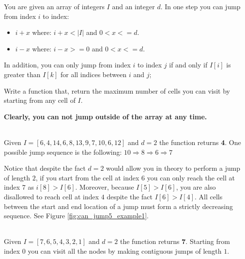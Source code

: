 \begin{exercise}
    You are given an array of integers $I$  and an integer $d$.
    In one step you can jump from index $i$ to index:
    \begin{itemize}
        \item $i + x$ where: $i + x < |I|$ and $0 < x <= d$.
        \item $i - x$ where: $i - x >= 0$ and $0 < x <= d$. 
    \end{itemize}
    In addition, you can only jump from index $i$ to index $j$ if and only if $I[i]$ is greater than $I[k]$ for all indices between $i$ and $j$;
        
    Write a function that, return the maximum number of cells you can visit by starting from any cell of $I$.
              
    \textbf{Clearly, you can not jump outside of the array at any time.}
    
    \begin{example}
        \hfill \\
        Given  $I=[6,4,14,6,8,13,9,7,10,6,12]$ and $d=2$ the function returns \textbf{4}.
        One possible jump sequence is the following:
        $10 \Rightarrow 8 \Rightarrow 6 \Rightarrow 7 $
        
        Notice that despite the fact $d=2$ would allow you in theory to perform a jump of length $2$, if you start from the cell at index $6$ you can only reach the cell at index $7$ as $i[8]>I[6]$. Moreover, because $I[5] > I[6]$, you are also disallowed to reach cell at index $4$ despite the fact $I[6] > I[4]$. All cells between the start and end location of a jump must form a strictly decreasing sequence. See Figure \ref{fig:can_jump5_example1}.
        \label{ex:can_jump5_example1}
    \end{example}


    \begin{example}
        \hfill \\
        Given  $I=[7,6,5,4,3,2,1]$ and $d=2$ the function returns \textbf{7}.
        Starting from index $0$ you can visit all the nodes by making contiguous jumps of length $1$.
        \label{ex:can_jump5_example2}
    \end{example}
\end{exercise}

